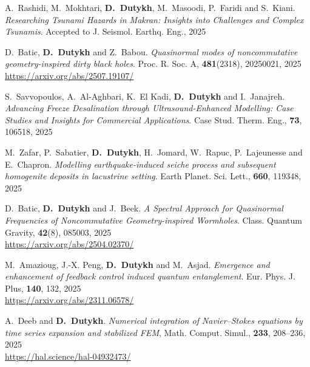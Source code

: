 \documentclass[final, a4paper, oneside, 12pt]{article}
\numberwithin{equation}{section}
\begin{document}
\begin{etaremune}

  

  \item A.~Rashidi, M.~Mokhtari, \textbf{D.~Dutykh}, M.~Masoodi, P.~Faridi and S.~Kiani. \textit{Researching Tsunami Hazards in Makran: Insights into Challenges and Complex Tsunamis}. Accepted to J. Seismol. Earthq. Eng., 2025 %
  
  \item D.~Batic, \textbf{D.~Dutykh} and Z.~Babou. \textit{Quasinormal modes of noncommutative geometry-inspired dirty black holes}. Proc. R. Soc. A, \textbf{481}(2318), 20250021, 2025 \\ %
  \url{https://arxiv.org/abs/2507.19107/}

  \item S.~Savvopoulos, A.~Al-Aghbari, K.~El Kadi, \textbf{D.~Dutykh} and I.~Janajreh. \textit{Advancing Freeze Desalination through Ultrasound-Enhanced Modelling: Case Studies and Insights for Commercial Applications}. Case Stud. Therm. Eng., \textbf{73}, 106518, 2025 %

  \item M.~Zafar, P.~Sabatier, \textbf{D.~Dutykh}, H.~Jomard, W.~Rapuc, P.~Lajeunesse and E.~Chapron. \textit{Modelling earthquake-induced seiche process and subsequent homogenite deposits in lacustrine setting}. Earth Planet. Sci. Lett., \textbf{660}, 119348, 2025 %

  \item D.~Batic, \textbf{D.~Dutykh} and J.~Beek. \textit{A Spectral Approach for Quasinormal Frequencies of Noncommutative Geometry-inspired Wormholes}. Class. Quantum Gravity, \textbf{42}(8), 085003, 2025 \\ %
  \url{https://arxiv.org/abs/2504.02370/}

  \item M.~Amazioug, J.-X. Peng, \textbf{D.~Dutykh} and M.~Asjad. \textit{Emergence and enhancement of feedback control induced quantum entanglement}. Eur. Phys. J. Plus, \textbf{140}, 132, 2025 \\ %
  \url{https://arxiv.org/abs/2311.06578/}

  \item A.~Deeb and \textbf{D.~Dutykh}. \textit{Numerical integration of Navier--Stokes equations by time series expansion and stabilized FEM}, Math. Comput. Simul., \textbf{233}, 208--236, 2025 \\ %
  \url{https://hal.science/hal-04932473/}


\end{etaremune}
\end{document}
